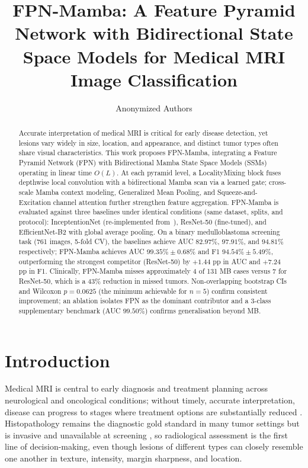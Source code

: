 \documentclass[runningheads]{llncs}
\begin{document}
\title{FPN-Mamba: A Feature Pyramid Network with Bidirectional State Space Models for Medical MRI Image Classification}
\author{Anonymized Authors}
\maketitle

\begin{abstract}
Accurate interpretation of medical MRI is critical for early disease detection, yet lesions vary widely in size, location, and appearance, and distinct tumor types often share visual characteristics. This work proposes FPN-Mamba, integrating a Feature Pyramid Network (FPN) with Bidirectional Mamba State Space Models (SSMs) operating in linear time $O(L)$. At each pyramid level, a LocalityMixing block fuses depthwise local convolution with a bidirectional Mamba scan via a learned gate; cross-scale Mamba context modeling, Generalized Mean Pooling, and Squeeze-and-Excitation channel attention further strengthen feature aggregation. FPN-Mamba is evaluated against three baselines under identical conditions (same dataset, splits, and protocol): InceptentionNet (re-implemented from~\cite{fang2025}), ResNet-50 (fine-tuned), and EfficientNet-B2 with global average pooling. On a binary medulloblastoma screening task (761 images, 5-fold CV), the baselines achieve AUC $82.97\%$, $97.91\%$, and $94.81\%$ respectively; FPN-Mamba achieves AUC $99.35\%\pm0.68\%$ and F1 $94.54\%\pm5.49\%$, outperforming the strongest competitor (ResNet-50) by $+1.44$ pp in AUC and $+7.24$ pp in F1. Clinically, FPN-Mamba misses approximately 4 of 131 MB cases versus 7 for ResNet-50, which is a 43\% reduction in missed tumors. Non-overlapping bootstrap CIs and Wilcoxon $p{=}0.0625$ (the minimum achievable for $n{=}5$) confirm consistent improvement; an ablation isolates FPN as the dominant contributor and a 3-class supplementary benchmark (AUC $99.50\%$) confirms generalisation beyond MB.
\end{abstract}
\section{Introduction}
Medical MRI is central to early diagnosis and treatment planning across neurological and oncological conditions; without timely, accurate interpretation, disease can progress to stages where treatment options are substantially reduced \cite{gillespie2022}. Histopathology remains the diagnostic gold standard in many tumor settings but is invasive and unavailable at screening \cite{tseng2023}, so radiological assessment is the first line of decision-making, even though lesions of different types can closely resemble one another in texture, intensity, margin sharpness, and location.
\end{document}

